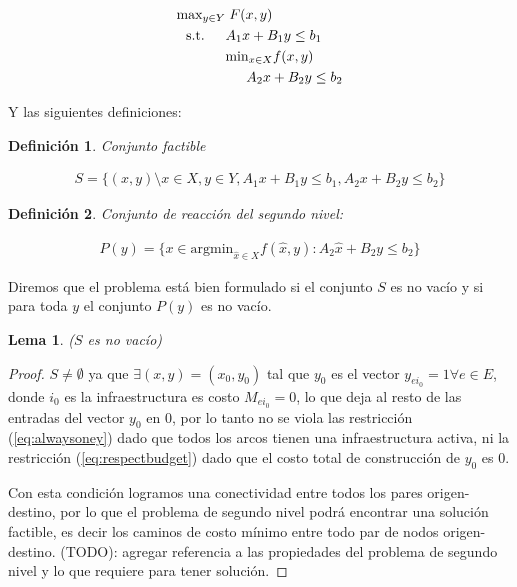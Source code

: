 \documentclass{article}
\newtheorem{definition}{Definición}
\newtheorem{lemma}{Lema}
\newcommand{\modelspace}{\hspace{1.5em}}
\begin{document}
  \begin{align}
    \text{max}_{y \in Y}    & \; F(x, y) \\
    \text{s.t.} \modelspace & A_1 x + B_1 y \leq b_1 \\
                            & \text{min}_{x \in X} f(x, y) \\
                            & \modelspace A_2 x + B_2 y \leq b_2
  \end{align}

  Y las siguientes definiciones:

  \begin{definition}
    Conjunto factible

    \begin{align}
      S = \{(x, y) \setminus x \in X, y \in Y, A_1 x + B_1 y \leq b_1, A_2 x + B_2 y \leq b_2 \}
    \end{align}
  \end{definition}

  \begin{definition}
    Conjunto de reacción del segundo nivel:

    \begin{align}
      P(y) = \{ x \in \text{argmin}_{\hat{x} \in X} f(\hat{x}, y) : A_2 \hat{x} + B_2 y \leq b_2 \}
    \end{align}
  \end{definition}

  Diremos que el problema está bien formulado si el conjunto $S$ es no vacío y si para toda $y$ el conjunto $P(y)$ es no vacío.

  \begin{lemma}($S$ es no vacío)
  \end{lemma}

  \begin{proof}
    $S \neq \emptyset$ ya que $\exists (x, y) = (x_0, y_0)$ tal que $y_0$ es el vector $y_{ei_0} = 1 \forall e \in E$, donde $i_0$ es la infraestructura es costo $M_{ei_0} = 0$, lo que deja al resto de las entradas del vector $y_0$ en $0$, por lo tanto no se viola las restricción (\ref{eq:alwaysoney}) dado que todos los arcos tienen una infraestructura activa, ni la restricción (\ref{eq:respectbudget}) dado que el costo total de construcción de $y_0$ es $0$.

    Con esta condición logramos una conectividad entre todos los pares origen-destino, por lo que el problema de segundo nivel podrá encontrar una solución factible, es decir los caminos de costo mínimo entre todo par de nodos origen-destino.
    (TODO): agregar referencia a las propiedades del problema de segundo nivel y lo que requiere para tener solución.
  \end{proof}
\end{document}

